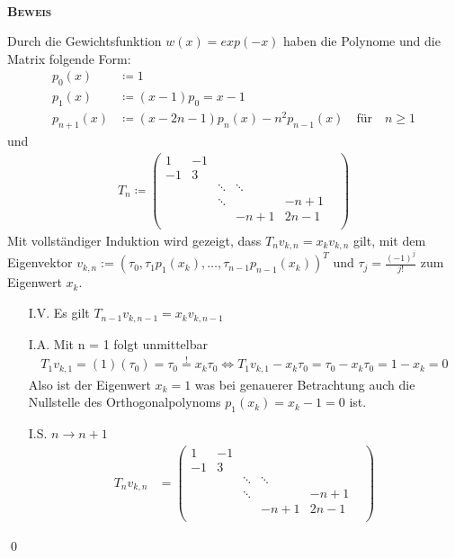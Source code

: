 \documentclass[12pt,a4paper]{scrartcl}
\numberwithin{equation}{section}
\numberwithin{myalgctr}{section}
\numberwithin{mytheoremctr}{subsection}
\numberwithin{mykorollarctr}{subsection}
\numberwithin{mylemmactr}{subsection}
\numberwithin{mybeispielctr}{subsection}
\newenvironment{myproof}{%
	\bigskip\noindent%
	\textsc{\textbf{\\Beweis\\}}%
	\indent
}{\qed\par\bigskip}  %
\begin{document}
	\begin{myproof}
				Durch die Gewichtsfunktion $w(x) = exp(-x)$ haben die Polynome und die Matrix folgende Form:	
		\begin{align*}	
		p_0(x) &\coloneqq 1\\	
		p_1(x) &\coloneqq (x-1) p_0 = x-1 \\	
		p_{n+1}(x) &\coloneqq (x-2n-1)p_n(x)-n^2 p_{n-1}(x) \quad \text{f\"ur}  \quad n\geq 1	
		\end{align*} 	
		und 	
		\begin{align*}	
		T_n\coloneqq 	
		\begin{pmatrix}	
		1 		     & 	-1			 	&  				  & &\\	
		-1		 	 & 3				& 			   	  & & \\	
		&   		 & \ddots 		    & \ddots 			&\\	
		&					& \ddots 	&					& -n+1\\	
		&		&			&-n+1 		&2n-1				&\\	
		\end{pmatrix}	
		\end{align*}	
		Mit vollständiger Induktion wird gezeigt, dass $T_nv_{k,n} = x_kv_{k,n}$ gilt, mit dem Eigenvektor 	
		$v_{k,n} := (\tau_0,\tau_1p_1(x_k),\ldots,\tau_{n-1}p_{n-1}(x_k))^{T}$ und $\tau_j = \frac{(-1)^{j}}{j!}$ zum Eigenwert $x_k$.	
		\begin{itemize}	
			\item[I.V.] 	
			Es gilt $T_{n-1}v_{k,n-1} = x_kv_{k,n-1}$	
			\item[I.A.] 	
			Mit n = 1 folgt unmittelbar	
			\begin{align*}	
			T_1v_{k,1} = (1)(\tau_0) = \tau_0 \stackrel{!}{=} x_k\tau_0 \Leftrightarrow T_1v_{k,1} - x_k\tau_0 = \tau_0 - x_k\tau_0 = 1 - x_k = 0	
			\end{align*}	
			Also ist der Eigenwert $x_k = 1$ was bei genauerer Betrachtung auch die Nullstelle des Orthogonalpolynoms $p_1(x_k) = x_k - 1 = 0$ ist. 	
			\item[I.S.] $n \rightarrow n + 1$	
			\begin{align*}	 	
				T_nv_{k,n}
				& =
				\begin{pmatrix}	
					1 		     & 	-1			 	&  				  & &\\	
					-1		 	 & 3				& 			   	  & & \\	
					&   		 & \ddots 		    & \ddots 			&\\	
					&					& \ddots 	&					& -n+1\\	
					&		&			&-n+1 		&2n-1				&\\	

\end{pmatrix}
\end{align*}
\end{itemize}
\end{myproof}
\end{document}

